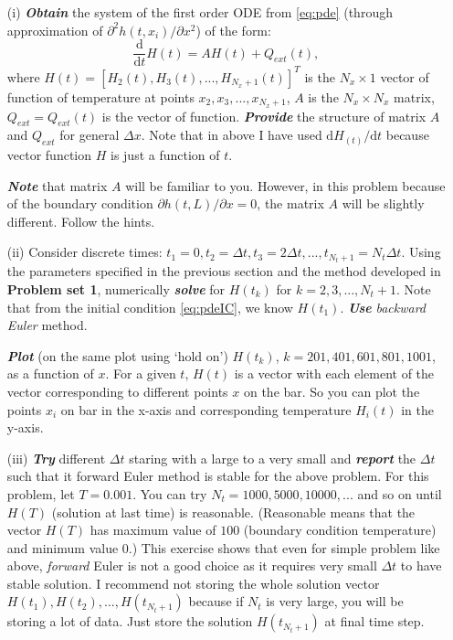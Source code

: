 \documentclass[11pt,a4paper]{article}
\newcommand{\dd}{\mathrm{d}}
\newcommand{\p}{\partial }
\newcommand{\bfit}[1]{\textit{\textbf{#1}}}
\begin{document}
\begin{itemize}
\item[(i)] \bfit{Obtain} the system of the first order ODE from \eqref{eq:pde} (through approximation of $\p^2 h(t, x_i)/ \p x^2$) of the form:
\begin{equation}\label{eq:pdeDisc}
\frac{\dd}{\dd t} H(t) = A H(t) + Q_{ext} (t),
\end{equation}
where $H(t) = [H_2(t), H_3(t), ..., H_{N_x + 1}(t)]^T$ is the $N_x \times 1$ vector of function of temperature at points $x_2, x_3, ..., x_{N_x + 1}$, $A$ is the $N_x \times N_x$ matrix, $Q_{ext} = Q_{ext}(t)$ is the vector of function. \bfit{Provide} the structure of matrix $A$ and $Q_{ext}$ for general $\Delta x$.  Note that in above I have used $\dd H_(t) / \dd t$ because vector function $H$ is just a function of $t$.

\bfit{Note} that matrix $A$ will be familiar to you. However, in this problem because of the boundary condition $\p h(t, L) / \p x = 0$, the matrix $A$ will be slightly different. Follow the hints.  

\item[(ii)] Consider discrete times: $t_1 = 0, t_2 = \Delta t, t_3 = 2\Delta t, ..., t_{N_t + 1} = N_t \Delta t$. Using the parameters specified in the previous section and the method developed in {\bf Problem set 1}, numerically \bfit{solve} for $H(t_k)$ for $k=2, 3, ..., N_t + 1$. Note that from the initial condition \eqref{eq:pdeIC}, we know $H(t_1)$. \bfit{Use} {\it backward Euler} method. 

\bfit{Plot} (on the same plot using `hold on') $H(t_k)$, $k=201, 401, 601, 801, 1001$, as a function of $x$. For a given $t$, $H(t)$ is a vector with each element of the vector corresponding to different points $x$ on the bar. So you can plot the points $x_i$ on bar in the x-axis and corresponding temperature $H_i(t)$ in the y-axis.

\item[(iii)] \bfit{Try} different $\Delta t$ staring with a large to a very small and \bfit{report} the $\Delta t$ such that {it forward Euler} method is stable for the above problem. For this problem, let $T = 0.001$. You can try $N_t = 1000, 5000, 10000, ...$ and so on until $H(T)$ (solution at last time) is reasonable. (Reasonable means that the vector $H(T)$ has maximum value of $100$ (boundary condition temperature) and minimum value $0$.) This exercise shows that even for simple problem like above, \textit{forward} Euler is not a good choice as it requires very small $\Delta t$ to have stable solution. I recommend not storing the whole solution vector $H(t_1), H(t_2), ..., H(t_{N_t + 1})$ because if $N_t$ is very large, you will be storing a lot of data. Just store the solution $H(t_{N_t + 1})$ at final time step.
\end{itemize}
 
\end{document}
